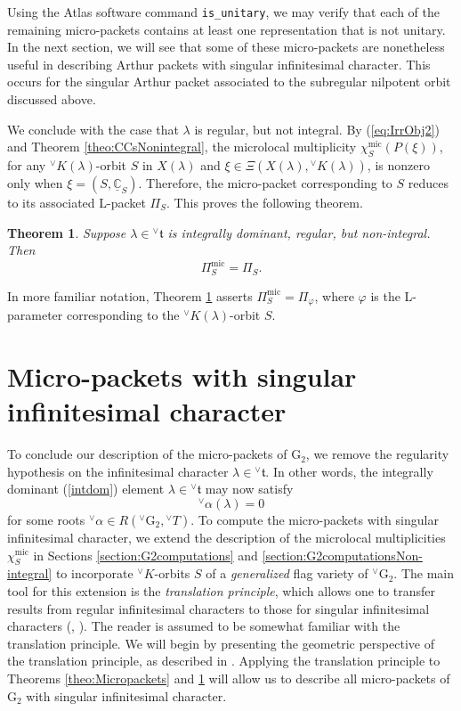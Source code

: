 \documentclass[a4paper, 11pt]{article}
\newtheorem{theo}{Theorem}[section]
\begin{document}
Using the Atlas software command
\texttt{is\_unitary}, we may verify 
that  each of the remaining micro-packets contains at
least one representation that is not unitary. In the next section, we
will see that some of these micro-packets are nonetheless useful in
describing Arthur packets with singular infinitesimal character. This
occurs for the singular Arthur packet associated to
the subregular nilpotent orbit discussed above. 
   
We conclude with the case that $\lambda$ is regular, but not integral. 
By (\ref{eq:IrrObj2}) and Theorem \ref{theo:CCsNonintegral},  the microlocal
multiplicity   
$\chi_S^{\mathrm{mic}}(P(\xi))$, for any
${}^{\vee}K(\lambda)$-orbit $S$ in $X(\lambda)$ and  $\xi\in
\Xi(X(\lambda), {}^{\vee}K(\lambda))$, 
is nonzero only when $\xi=(S,\underline{\mathbb{C}}_S)$.
Therefore, the micro-packet corresponding to $S$ 
reduces to its associated L-packet $\Pi_{S}$. This proves the following theorem.
\begin{theo}\label{theo:MicropacketsNonIntegral}
Suppose $\lambda \in {^\vee}\mathfrak{t}$ is integrally dominant,
regular, but non-integral. Then
$$
\Pi^{\mathrm{mic}}_S=\Pi_{S}.
$$
\end{theo}
In more familiar notation, Theorem
\ref{theo:MicropacketsNonIntegral} asserts $\Pi^{\mathrm{mic}}_S=\Pi_{\varphi}$,
where $\varphi$ is the L-parameter corresponding to
the ${}^{\vee}K(\lambda)$-orbit $S$.


\section{Micro-packets with singular infinitesimal character} 
\label{section:singularcase}


To conclude our description of the micro-packets of $\mathrm{G}_{2}$,
we remove the regularity hypothesis on the infinitesimal character
$\lambda\in{}^{\vee}\mathfrak{t}$. In 
other words, the integrally dominant   (\ref{intdom}) element
$\lambda\in{}^{\vee}\mathfrak{t}$ may now satisfy
$${^\vee}\alpha(\lambda) = 0$$
for some roots ${^\vee}\alpha \in R({^\vee}\mathrm{G}_{2}, {^\vee}T)$.
To compute the micro-packets with singular infinitesimal character, we
extend the description of the microlocal multiplicities  
$\chi_S^{\mathrm{mic}}$ in Sections \ref{section:G2computations} and
\ref{section:G2computationsNon-integral} to incorporate  
 ${}^{\vee}K$-orbits $S$ of a \emph{generalized} flag variety of
${}^{\vee}\mathrm{G}_{2}$.  The main tool for this extension is the
\emph{translation principle}, which allows one to transfer results
from regular infinitesimal characters to those for singular
infinitesimal characters (\cite{Jantzen}, \cite[Chapter
  7]{greenbook}).
The reader is assumed to be somewhat familiar with the translation
principle. We will begin by presenting
the geometric perspective of the translation principle, as described
in \cite[Chapter 8]{ABV}.  Applying the translation principle to
Theorems \ref{theo:Micropackets} and 
\ref{theo:MicropacketsNonIntegral} will allow us to describe all
micro-packets of $\mathrm{G}_{2}$ with singular infinitesimal character. 
\end{document}

